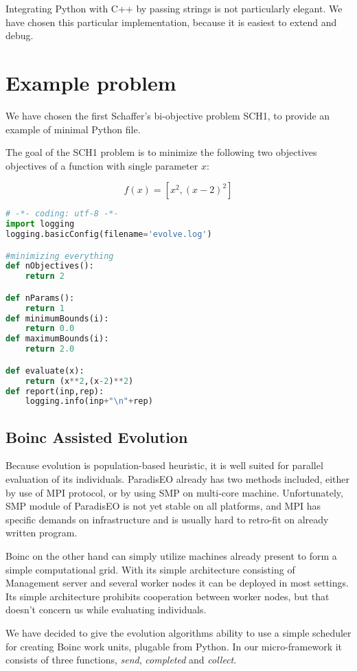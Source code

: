 \documentclass[12pt,oneside]{fithesis2}
\begin{document}
Integrating Python with C++ by passing strings is not particularly elegant. We have chosen this particular implementation, because it is easiest to extend and debug.

\section{Example problem}

We have chosen the first Schaffer's bi-objective problem SCH1, to provide an example of minimal Python file.

The goal of the SCH1 problem is to minimize the following two objectives objectives of a function with single parameter $x$:

$$f(x) = [x^2,(x-2)^2]$$

\begin{lstlisting}[language=Python,label=min_example,caption=Minimal working example]
# -*- coding: utf-8 -*-
import logging
logging.basicConfig(filename='evolve.log')

#minimizing everything 
def nObjectives():
	return 2

def nParams():
	return 1
def minimumBounds(i):
	return 0.0
def maximumBounds(i):
	return 2.0

def evaluate(x):
	return (x**2,(x-2)**2)
def report(inp,rep):
	logging.info(inp+"\n"+rep) 
\end{lstlisting}

\subsection{Boinc Assisted Evolution}
Because evolution is population-based heuristic, it is well suited for parallel evaluation of its individuals. ParadisEO already has two methods included, either by use of MPI protocol, or by using SMP on multi-core machine\cite{liefooghe2007Paradiseo}. Unfortunately, SMP module of ParadisEO is not yet stable on all platforms, and MPI has specific demands on infrastructure and is usually hard to retro-fit on already written program. 

Boinc on the other hand  can simply utilize machines already present to form a simple computational grid. With its simple architecture consisting of Management server and several worker nodes it can be deployed in most settings. Its simple architecture prohibits cooperation between worker nodes, but that doesn't concern us while evaluating individuals.

We have decided to give the evolution algorithms ability to use a simple scheduler for creating Boinc work units, plugable from Python. In our micro-framework it consists of three functions, \emph{send}, \emph{completed} and \emph{collect}.
\end{document}
